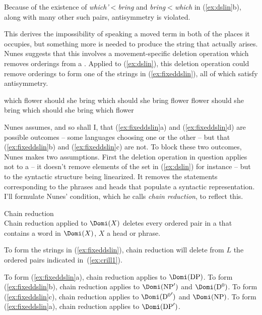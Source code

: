 \documentclass[output=paper]{langsci/langscibook}
\begin{document}
Because of the existence of \emph{which'$<$bring} and \emph{bring$<$which} in
(\ref{ex:dslin}b), along with many other such pairs, antisymmetry is violated.

This derives the impossibility of speaking a moved term in both of the places
it occupies, but something more is needed to produce the string that actually
arises. Nunes suggests that this involves a movement-specific deletion
operation which removes orderings from a . Applied to
(\ref{ex:dslin}), this deletion operation could remove orderings to form one of
the strings in (\ref{ex:fixeddslin}), all of which satisfy antisymmetry.
\begin{exe}
	\ex \label{ex:fixeddslin}
	\begin{xlist}
		\ex which flower should she bring
		\ex which should she bring flower
		\ex flower should she bring which
		\ex should she bring which flower
	\end{xlist}
\end{exe}

Nunes assumes, and so shall I, that (\ref{ex:fixeddslin}a) and
(\ref{ex:fixeddslin}d) are possible outcomes -- some languages choosing one or
the other -- but that (\ref{ex:fixeddslin}b) and (\ref{ex:fixeddslin}c) are
not. To block these two outcomes, Nunes makes two assumptions. First the
deletion operation in question applies not to a  -- it doesn't
remove elements of the set in (\ref{ex:dslin}) for instance -- but to the
syntactic structure being linearized. It removes the  statements
corresponding to the phrases and heads that populate a syntactic
representation. I'll formulate Nunes' condition, which he calls \emph{chain
reduction}, to reflect this.

\begin{exe}
	\ex \label{ex:chain} Chain reduction\\
	Chain reduction applied to $\Domi(X)$ deletes every ordered pair in a  that contains a word in $\Domi(X)$, $X$ a head or phrase.
\end{exe}

To form the strings in (\ref{ex:fixeddslin}), chain reduction will delete from $L$ the ordered pairs indicated in~(\ref{ex:crill1}).
\begin{exe}
	\ex \label{ex:crill1}
	\begin{xlist}
		\ex To form (\ref{ex:fixeddslin}a), chain reduction applies to $\Domi(\text{DP})$.
		\ex To form (\ref{ex:fixeddslin}b), chain reduction applies to $\Domi(\text{NP}')$ and $\Domi(\text{D\textsuperscript{0}})$.
		\ex To form (\ref{ex:fixeddslin}c), chain reduction applies to $\Domi({\text{D\textsuperscript{0}}}')$ and $\Domi(\text{NP})$.
		\ex To form (\ref{ex:fixeddslin}a), chain reduction applies to $\Domi(\text{DP}')$.
	\end{xlist}
\end{exe}
\end{document}
